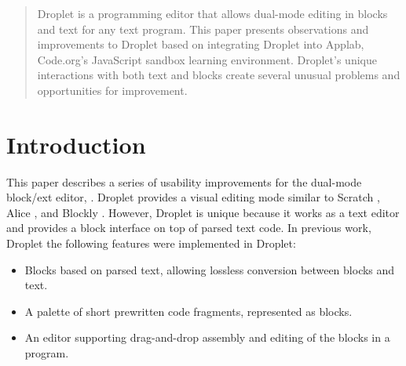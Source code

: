 \documentclass[conference]{IEEEtran}
\begin{document}
\begin{abstract}
Droplet is a programming editor that allows dual-mode editing in blocks and text for any text program. This paper presents observations and improvements to Droplet based on integrating Droplet into Applab, Code.org's JavaScript sandbox learning environment. Droplet's unique interactions with both text and blocks create several unusual problems and opportunities for improvement.

\end{abstract}





%
\IEEEpeerreviewmaketitle

\section{Introduction}
This paper describes a series of usability improvements for the dual-mode block/ext editor, \cite{Droplet}. Droplet provides a visual editing mode similar to Scratch \cite{Scratch}, Alice \cite{Alice}, and Blockly \cite{Blockly}. However, Droplet is unique because it works as a text editor and provides a block interface on top of parsed text code. In previous work, Droplet the following features were implemented in Droplet:

\begin{itemize}
  \item Blocks based on parsed text, allowing lossless conversion between blocks and text.
  \item A palette of short prewritten code fragments, represented as blocks.
  \item An editor supporting drag-and-drop assembly and editing of the blocks in a program.
\end{itemize}
\end{document}
